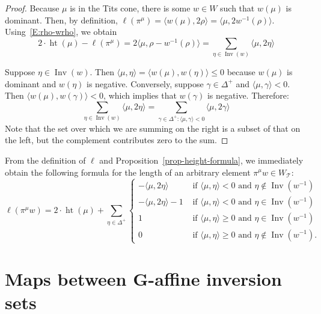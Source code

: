 \documentclass[ALCO,ThmDefs,Unicode]{cedram}
\DeclareMathOperator{\height}{ht}
\DeclareMathOperator{\Inv}{Inv}
\newcommand{\bG}{\mathbf{G}}
\newcommand{\cT}{\mathcal{T}}
\newcommand{\WTits}{W_{\TitsCone}}
\newcommand{\TitsCone}{\cT}
\newcommand{\textif}{\text{ if }}
\newcommand{\textand}{\text{ and }}
\begin{document}
\begin{proof}
Because $\mu$ is in the Tits cone, there is some $w \in W$ such that $w(\mu)$ is dominant. Then, by definition, $\ell(\pi^\mu) = \langle w(\mu), 2\rho \rangle = \langle \mu, 2w^{-1}(\rho) \rangle $. Using~\eqref{E:rho-wrho}, we obtain
\begin{equation}
2\cdot\height(\mu) - \ell(\pi^\mu) = 2\langle \mu,\rho-w^{-1}(\rho)\rangle = \sum_{\eta\in\Inv(w)} \langle \mu, 2\eta\rangle
\end{equation}

Suppose $\eta \in \Inv(w)$. Then $\langle \mu, \eta \rangle = \langle w(\mu), w(\eta) \rangle \leq 0$ because $w(\mu)$ is dominant and $w(\eta)$ is negative. Conversely, suppose $\gamma\in\Delta^+$ and $\langle \mu, \gamma \rangle < 0$. Then $\langle w(\mu), w(\gamma) \rangle < 0$, which implies that $w(\gamma)$ is negative. Therefore:
\begin{equation}\label{eq:18}
\sum_{\eta \in \Inv(w)} \langle \mu, 2 \eta \rangle = \sum_{\gamma\in\Delta^+ : \langle \mu, \gamma \rangle < 0} \langle \mu, 2\gamma \rangle
\end{equation}
Note that the set over which we are summing on the right is a subset of that on the left, but the complement contributes zero to the sum.
\end{proof}

From the definition of $\ell$ and Proposition~\ref{prop-height-formula}, we immediately obtain the following formula for the length of an arbitrary element $\pi^\mu w\in \WTits$:
\begin{equation}\label{eq:19}
\ell(\pi^\mu w) = 2 \cdot \height(\mu) + \sum_{\eta\in\Delta^+}
\begin{cases}
- \langle \mu, 2 \eta \rangle & \textif \langle \mu, \eta \rangle < 0 \textand \eta \notin \Inv(w^{-1}) \\
- \langle \mu, 2 \eta \rangle -1 & \textif \langle \mu, \eta \rangle < 0 \textand \eta \in \Inv(w^{-1}) \\
1 & \textif \langle \mu, \eta \rangle \geq 0 \textand \eta \in \Inv(w^{-1}) \\
0 & \textif \langle \mu, \eta \rangle \geq 0 \textand \eta \notin \Inv(w^{-1}).
\end{cases}
\end{equation}


\section{Maps between \texorpdfstring{$\bG$}{G}-affine inversion sets}
\end{document}
